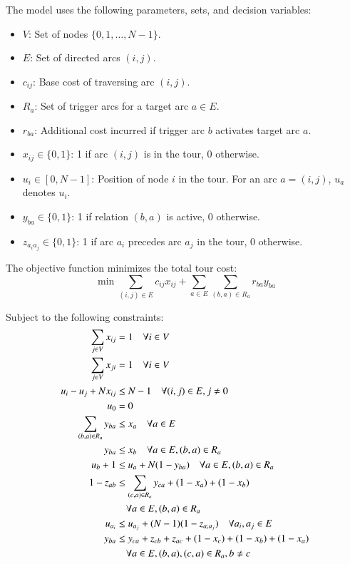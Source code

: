 \documentclass[twocolumn, switch]{article} %
\begin{document}
The model uses the following parameters, sets, and decision variables:
\begin{itemize}
    \item $V$: Set of nodes $\{0, 1, \dots, N-1\}$.
    \item $E$: Set of directed arcs $(i,j)$.
    \item $c_{ij}$: Base cost of traversing arc $(i,j)$.
    \item $R_a$: Set of trigger arcs for a target arc $a \in E$.
    \item $r_{ba}$: Additional cost incurred if trigger arc $b$ activates target arc $a$.
    \item $x_{ij} \in \{0, 1\}$: 1 if arc $(i,j)$ is in the tour, 0 otherwise.
    \item $u_i \in [0, N-1]$: Position of node $i$ in the tour. For an arc $a=(i,j)$, $u_a$ denotes $u_i$.
    \item $y_{ba} \in \{0, 1\}$: 1 if relation $(b,a)$ is active, 0 otherwise.
    \item $z_{a_ia_j} \in \{0, 1\}$: 1 if arc $a_i$ precedes arc $a_j$ in the tour, 0 otherwise.
\end{itemize}

\footnotesize

The objective function minimizes the total tour cost:
\begin{equation} \label{eq:obj}
\min \sum_{(i,j) \in E} c_{ij} x_{ij} + \sum_{a \in E} \sum_{(b,a) \in R_a} r_{ba} y_{ba}
\end{equation}

Subject to the following constraints:
\begin{subequations}
\begin{align}
    \sum_{j \in V} x_{ij} &= 1 \quad \forall i \in V \label{eq:flow_out} \\
    \sum_{j \in V} x_{ji} &= 1 \quad \forall i \in V \label{eq:flow_in} \\
    u_i - u_j + N x_{ij} &\leq N-1 \quad \forall (i,j) \in E, j \neq 0 \label{eq:mtz} \\
    u_0 &= 0 \label{eq:start_node} \\
    \sum_{(b,a) \in R_a} y_{ba} &\leq x_a \quad \forall a \in E \label{eq:rel_active_1} \\
    y_{ba} &\leq x_b \quad \forall a \in E, (b,a) \in R_a \label{eq:rel_active_2} \\
    u_b + 1 &\leq u_a + N(1-y_{ba}) \quad \forall a \in E, (b,a) \in R_a \label{eq:rel_precedence} \\
    1 - z_{ab} &\leq \sum_{(c,a) \in R_a} y_{ca} + (1 - x_a) + (1 - x_b) \notag \\
    &\quad \forall a \in E, (b,a) \in R_a \label{eq:rel_active_3} \\
    u_{a_i} &\leq u_{a_j} + (N-1)(1-z_{a_ia_j}) \quad \forall a_i, a_j \in E \label{eq:z_precedence} \\
    y_{ba} &\leq y_{ca} + z_{cb} + z_{ac} + (1-x_c) + (1-x_b) + (1-x_a) \notag \\
    &\quad \forall a \in E, (b,a),(c,a) \in R_a, b \neq c \label{eq:rel_last_trigger}
\end{align}
\end{subequations}
\end{document}

